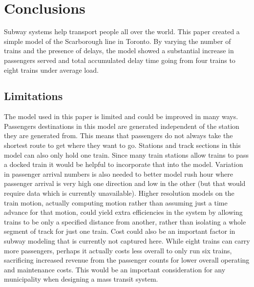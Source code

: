 \section{Conclusions}

Subway systems help transport people all over the world. This paper created a
simple model of the Scarborough line in Toronto. By varying the number of trains
and the presence of delays, the model showed a substantial increase in passengers
served and total accumulated delay time going from four trains to eight trains under average load. 

\subsection{Limitations}

The model used in this paper is limited and could be improved in many ways. Passengers
destinations in this model are generated independent of the station they are generated
from. This means that passengers do not always take the shortest route to get where
they want to go. Stations and track sections in this model can also only hold one train. Since many train
stations allow trains to pass a docked train it would be helpful to incorporate that
into the model. Variation in passenger arrival numbers is also needed to better model
rush hour where passenger arrival is very high one direction and low in the other (but 
that would require data which is currently unavailable).  Higher resolution models on the train motion, actually computing motion rather than assuming just a time advance for that motion, could yield extra efficiencies in the system by allowing trains to be only a specified distance from another, rather than isolating a whole segment of track for just one train. Cost could also be an important factor in subway modeling that is currently not captured here.  While eight trains can carry more passengers, perhaps it actually costs less overall to only run six trains, sacrificing increased revenue from the passenger counts for lower overall operating and maintenance costs.  This would be an important consideration for any municipality when designing a mass transit system.  